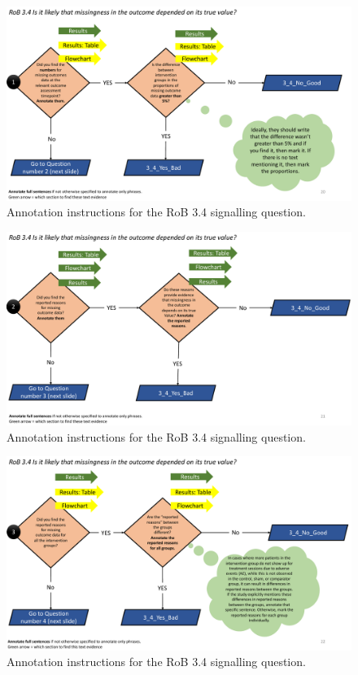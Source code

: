 \documentclass[sn-mathphys,Numbered]{sn-jnl}%
\begin{document}
\begin{figure}[hbt]
    \centering
    \includegraphics[width=\textwidth]{figures/3_4_1.pdf}
    \caption{Annotation instructions for the RoB 3.4 signalling question.}
    \label{fig:3_4_1}
\end{figure}


\begin{figure}[hbt]
    \centering
    \includegraphics[width=\textwidth]{figures/3_4_2.pdf}
    \caption{Annotation instructions for the RoB 3.4 signalling question.}
    \label{fig:3_4_2}
\end{figure}


\begin{figure}[hbt]
    \centering
    \includegraphics[width=\textwidth]{figures/3_4_3.pdf}
    \caption{Annotation instructions for the RoB 3.4 signalling question.}
    \label{fig:3_4_3}
\end{figure}
\end{document}

